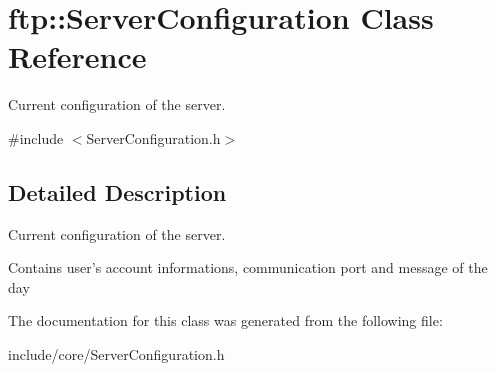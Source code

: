 \hypertarget{classftp_1_1_server_configuration}{\section{ftp\-:\-:Server\-Configuration Class Reference}
\label{classftp_1_1_server_configuration}
}


Current configuration of the server.  




{\ttfamily \#include $<$Server\-Configuration.\-h$>$}



\subsection{Detailed Description}
Current configuration of the server. 

Contains user's account informations, communication port and message of the day 

The documentation for this class was generated from the following file\-:\begin{DoxyCompactItemize}
\item 
include/core/Server\-Configuration.\-h\end{DoxyCompactItemize}
